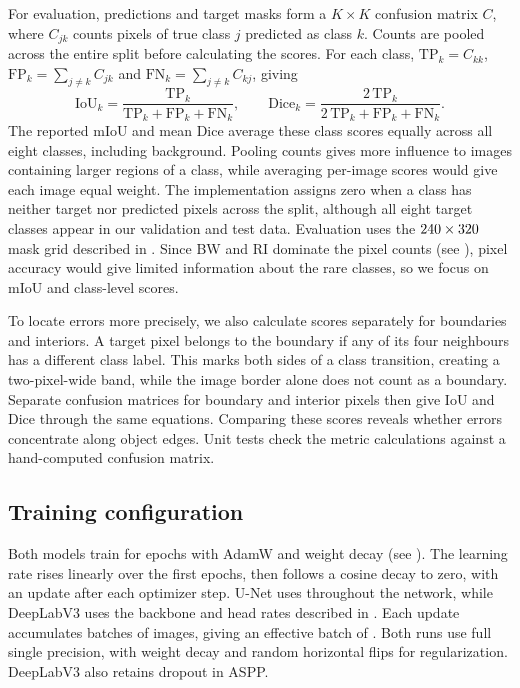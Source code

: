 For evaluation, predictions and target masks form a $K\times K$ confusion
matrix $C$, where $C_{jk}$ counts pixels of true class $j$ predicted as class
$k$. Counts are pooled across the entire split before calculating the scores.
For each class, $\mathrm{TP}_k=C_{kk}$,
$\mathrm{FP}_k=\sum_{j\ne k}C_{jk}$ and
$\mathrm{FN}_k=\sum_{j\ne k}C_{kj}$, giving
\begin{equation}
\mathrm{IoU}_k=\frac{\mathrm{TP}_k}{\mathrm{TP}_k+\mathrm{FP}_k+\mathrm{FN}_k},
\qquad
\mathrm{Dice}_k=\frac{2\,\mathrm{TP}_k}{2\,\mathrm{TP}_k+\mathrm{FP}_k+\mathrm{FN}_k}.
\end{equation}
The reported mIoU and mean Dice average these class scores equally across all
eight classes, including background. Pooling counts gives more influence to
images containing larger regions of a class, while averaging per-image scores
would give each image equal weight. The implementation assigns zero when a
class has neither target nor predicted pixels across the split, although all
eight target classes appear in our validation and test data. Evaluation uses
the $240\times320$ mask grid described in
. Since BW and RI dominate the pixel counts
(see ), pixel accuracy would give limited information about the
rare classes, so we focus on mIoU and class-level scores.

To locate errors more precisely, we also calculate scores separately for
boundaries and interiors. A target pixel belongs to the boundary if any of its
four neighbours has a different class label. This marks both sides of a class
transition, creating a two-pixel-wide band, while the image border alone does
not count as a boundary. Separate confusion matrices for boundary and interior
pixels then give IoU and Dice through the same equations. Comparing these
scores reveals whether errors concentrate along object edges. Unit tests check
the metric calculations against a hand-computed confusion matrix.

\subsection{Training configuration}
\label{sec:training}
Both models train for \unetEpochs{} epochs with AdamW and weight decay
\unetWeightDecay{} (see ). The learning rate rises
linearly over the first \unetWarmupEpochs{} epochs, then follows a cosine decay
to zero, with an update after each optimizer step. U-Net uses
\unetLearningRate{} throughout the network, while DeepLabV3 uses the backbone
and head rates described in . Each update accumulates
\suimAccumulation{} batches of \suimBatch{} images, giving an effective batch
of \suimEffectiveBatch{}. Both runs use full single precision, with weight
decay and random horizontal flips for regularization. DeepLabV3 also retains
dropout in ASPP.

